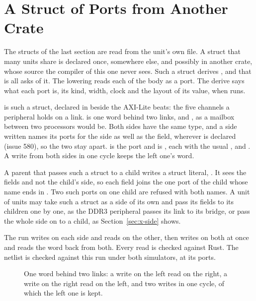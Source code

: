 \section{A Struct of Ports from Another Crate}
\label{sec:x-bundle}

The structs of the last section are read from the unit's own file.
A struct that many units share is declared once, somewhere else,
and possibly in another crate, whose source the compiler of this one
never sees. Such a struct derives , and that is all
\code{\#[lower]} asks of it. The lowering reads each 
of the body as a port. The derive says what each port is, its kind,
width, clock and the layout of its value, when  runs.

 is such a struct, declared in 
beside the AXI-Lite beats: the five channels a peripheral holds on a
link.  is one word behind two links,  and
, as a mailbox between two processors would be. Both
sides have the same type, and a side written  names its
ports for the side as well as the field, wherever  is
declared (issue 580), so the two stay apart.  is the port  and
 is , each with the usual
,  and . A write from both
sides in one cycle keeps the left one's word.

A parent that passes such a struct to a child writes a struct
literal, . It sees the fields and not
the child's side, so each field joins the one port of the child
whose name ends in . Two such ports on one child are
refused with both names. A unit of units may take such a struct
as a side of its own and pass its fields to its children one by one,
as the DDR3 peripheral passes its link to its bridge, or pass the
whole side on to a child, as Section~\ref{sec:x-side} shows.

The run writes on each side and reads on the other, then writes on
both at once and reads the word back from both. Every read is
checked against Rust. The netlist is checked against this run under
both simulators, at its ports.

\begin{figure}[htbp]
\centering

\caption{One word behind two links: a write on the left read on the
right, a write on the right read on the left, and two writes in one
cycle, of which the left one is kept.}
\label{fig:x-bundle}
\end{figure}




